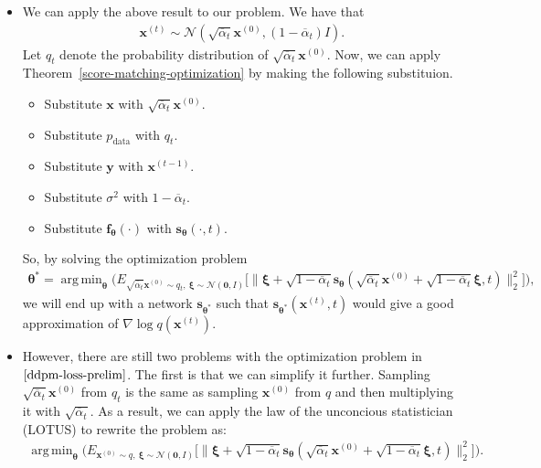 \documentclass[10pt]{article}
\newcommand{\ve}[1]{\mathbf{#1}}
\newcommand{\mrm}[1]{\mathrm{#1}}
\newcommand{\ves}[1]{\boldsymbol{#1}}
\newcommand{\mcal}[1]{\mathcal{#1}}
\DeclareMathOperator*{\argmin}{arg\,min}
\begin{document}
\begin{itemize}
  \item We can apply the above result to our problem. We have that
  \begin{align*}
    \ve{x}^{(t)} \sim \mcal{N}(\sqrt{\overline{\alpha}_t}\ve{x}^{(0)}, (1 - \overline{\alpha}_t) I).
  \end{align*}
  Let $q_t$ denote the probability distribution of $\sqrt{\overline{\alpha}_t}\ve{x}^{(0)}$. Now, we can apply Theorem~\ref{score-matching-optimization} by making the following substituion.
  \begin{itemize}
    \item Substitute $\ve{x}$ with $\sqrt{\overline{\alpha}_t} \ve{x}^{(0)}$.
    \item Substitute $p_{\mrm{data}}$ with $q_t$.
    \item Substitute $\ve{y}$ with $\ve{x}^{(t-1)}$.
    \item Substitute $\sigma^2$ with $1 - \overline{\alpha}_t$.
    \item Substitute $\ve{f}_{\ves{\theta}}(\cdot)$ with $\ve{s}_{\ves{\theta}}(\cdot, t)$.
  \end{itemize}
  So, by solving the optimization problem
  \begin{align}
    \ves{\theta}^* = \argmin_{\ves{\theta}} 
    \bigg( E_{ \sqrt{\overline{\alpha}_t} \ve{x}^{(0)} \sim q_t,\ \ves{\xi} \sim \mcal{N}(\ve{0},I)} 
        \Big[ \Big\| \ves{\xi} + \sqrt{1 - \overline{\alpha}_t} \ve{s}_{\ves{\theta}}(\sqrt{\overline{\alpha}_t} \ve{x}^{(0)} + \sqrt{1 - \overline{\alpha}_t} \ves{\xi}, t) \Big\|^2_2 \Big]
    \bigg), \label{ddpm-loss-prelim}
  \end{align}
  we will end up with a network $\ve{s}_{\ves{\theta}^*}$ such that $\ve{s}_{\ves{\theta}^*}(\ve{x}^{(t)}, t)$ would give a good approximation of $\nabla \log q(\ve{x}^{(t)})$.

  \item However, there are still two problems with the optimization problem in $\eqref{ddpm-loss-prelim}$. The first is that we can simplify it further. Sampling $\sqrt{\overline{\alpha}_t} \ve{x}^{(0)}$ from $q_t$ is the same as sampling $\ve{x}^{(0)}$ from $q$ and then multiplying it with $\sqrt{\overline{\alpha}_t}$. As a result, we can apply the law of the unconcious statistician (LOTUS) to rewrite the problem as:
  \begin{align*}
    \argmin_{\ves{\theta}} \bigg( 
      E_{ \ve{x}^{(0)} \sim q,\ \ves{\xi} \sim \mcal{N}(\ve{0},I)} 
     \Big[ \Big\| \ves{\xi} + \sqrt{1 - \overline{\alpha}_t} \ve{s}_{\ves{\theta}}(\sqrt{\overline{\alpha}_t} \ve{x}^{(0)} + \sqrt{1 - \overline{\alpha}_t} \ves{\xi}, t) \Big\|^2_2 \Big] \bigg).
  \end{align*}
  

\end{itemize}
\end{document}
